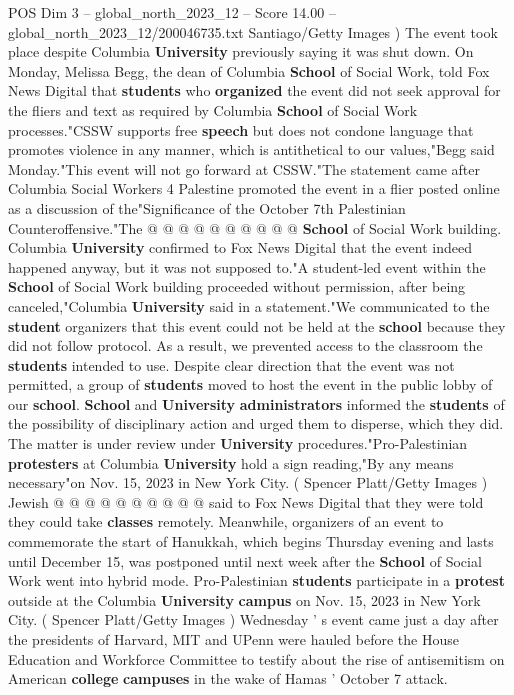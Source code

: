 \begin{textsample}{POS Dim 3 – global\_north\_2023\_12 – Score 14.00 – global\_north\_2023\_12/200046735.txt}
Santiago/Getty Images ) The event took place despite Columbia \textbf{University} previously saying it was shut down.
On Monday, Melissa Begg, the dean of Columbia \textbf{School} of Social Work, told Fox News Digital that \textbf{students} who \textbf{organized} the event did not seek approval for the fliers and text as required by Columbia \textbf{School} of Social Work processes."CSSW supports free \textbf{speech} but does not condone language that promotes violence in any manner, which is antithetical to our values,"Begg said Monday."This event will not go forward at CSSW."The statement came after Columbia Social Workers 4 Palestine promoted the event in a flier posted online as a discussion of the"Significance of the October 7th Palestinian Counteroffensive."The @ @ @ @ @ @ @ @ @ @ \textbf{School} of Social Work building.
Columbia \textbf{University} confirmed to Fox News Digital that the event indeed happened anyway, but it was not supposed to."A student-led event within the \textbf{School} of Social Work building proceeded without permission, after being canceled,"Columbia \textbf{University} said in a statement."We communicated to the \textbf{student} organizers that this event could not be held at the \textbf{school} because they did not follow protocol.
As a result, we prevented access to the classroom the \textbf{students} intended to use.
Despite clear direction that the event was not permitted, a group of \textbf{students} moved to host the event in the public lobby of our \textbf{school}. \textbf{School} and \textbf{University} \textbf{administrators} informed the \textbf{students} of the possibility of disciplinary action and urged them to disperse, which they did.
The matter is under review under \textbf{University} procedures."Pro-Palestinian \textbf{protesters} at Columbia \textbf{University} hold a sign reading,"By any means necessary"on Nov. 15, 2023 in New York City. ( Spencer Platt/Getty Images ) Jewish @ @ @ @ @ @ @ @ @ @ said to Fox News Digital that they were told they could take \textbf{classes} remotely.
Meanwhile, organizers of an event to commemorate the start of Hanukkah, which begins Thursday evening and lasts until December 15, was postponed until next week after the \textbf{School} of Social Work went into hybrid mode.
Pro-Palestinian \textbf{students} participate in a \textbf{protest} outside at the Columbia \textbf{University} \textbf{campus} on Nov. 15, 2023 in New York City. ( Spencer Platt/Getty Images ) Wednesday ' s event came just a day after the presidents of Harvard, MIT and UPenn were hauled before the House Education and Workforce Committee to testify about the rise of antisemitism on American \textbf{college} \textbf{campuses} in the wake of Hamas ' October 7 attack.

\end{textsample}
